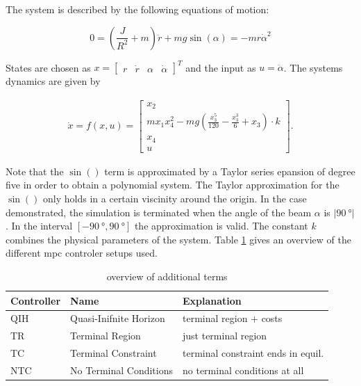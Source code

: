 \documentclass[10pt,a4paper,titlepage]{article}
\begin{document}
The system is described by the following equations of motion:

\begin{equation}
    0 = \left(\frac{J}{R^2} + m\right)\ddot{r} + mg\sin(\alpha) = - mr\dot{\alpha}^2
\end{equation}

States are chosen as $x = \begin{bmatrix} r & \dot{r} & \alpha & \dot{\alpha} \end{bmatrix}^T$ and the input as $u = \ddot{\alpha}$. The systems dynamics are given by

\begin{align}
    \dot{x} = f(x,u) = \begin{bmatrix}
        x_2 \\
        m x_1 x_4^2 - m g \left(\frac{x_3^5}{120} - \frac{x_3^3}{6} + x_3\right) \cdot k \\
        x_4 \\
        u
    \end{bmatrix}.
\end{align}

Note that the $\sin()$ term is approximated by a Taylor series epansion of degree five in order to obtain a polynomial system.
The Taylor approximation for the $\sin()$ only holds in a certain viscinity around the origin. In the case demonstrated, the simulation is terminated when
the angle of the beam $\alpha$ is $|\SI{90}{\degree}|$. In the interval $[-\SI{90}{\degree}, \SI{90}{\degree}]$ the approximation is valid.
The constant $k$ combines the physical parameters of the system. Table \ref{tbl:controler} gives an overview of the different \gls{mpc} controler setups used.

\renewcommand{\arraystretch}{1.25}
\begin{table}[ht]
    \centering
    \captionsetup{skip=0.25cm}
    \caption{overview of additional terms}
    \label{tbl:controler}
    \begin{tabular}{|p{2cm}|p{3.75cm}|p{5.75cm}|}
        \hline
        \textbf{Controller} & \textbf{Name} &  \textbf{Explanation}\\
        \hline
        QIH & Quasi-Inifnite Horizon & terminal region + costs\\
        \hline
        TR & Terminal Region & just terminal region\\
        \hline
        TC & Terminal Constraint & terminal constraint ends in equil.\\
        \hline
        NTC & No Terminal Conditions & no terminal conditions at all\\
        \hline
    \end{tabular}
\end{table}
\end{document}
